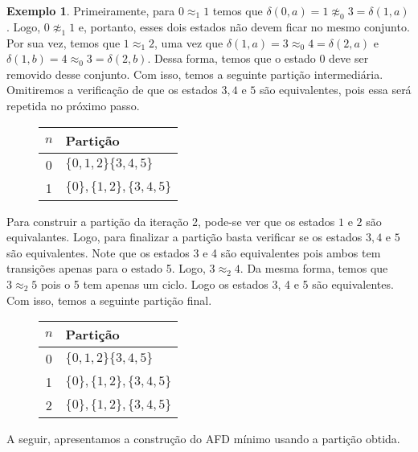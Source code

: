 \documentclass[a4paper]{article}
\theoremstyle{definition}
\newtheorem{Example}{Exemplo}
\begin{document}
\begin{Example}
    Primeiramente, para $0 \approx_1 1$ temos que $\delta(0,a) = 1 \not\approx_0
    3 = \delta(1,a)$. Logo, $0\not\approx_1 1$ e, portanto, esses dois estados
    não devem ficar no mesmo conjunto. Por sua vez, temos que $1 \approx_1 2$,
    uma vez que $\delta(1,a) = 3 \approx_0 4 = \delta(2,a)$ e
    $\delta(1,b) = 4 \approx_0 3 = \delta(2,b)$. Dessa forma, temos que o estado
    $0$ deve ser removido desse conjunto. Com isso, temos a seguinte partição
    intermediária. Omitiremos a verificação de que os estados $3,4$ e $5$ são
    equivalentes, pois essa será repetida no próximo passo.
    \begin{figure}[H]
      \begin{tabular}{|c|l|}
        \hline
        $n$ & Partição \\ \hline
        0   & $\{0,1,2\}\{3,4,5\}$ \\\hline
        1   & $\{0\},\{1,2\},\{3,4,5\}$ \\ \hline
      \end{tabular}
      \centering
    \end{figure}
    Para construir a partição da iteração 2, pode-se ver que os estados $1$ e
    $2$ são equivalantes. Logo, para finalizar a partição basta verificar se
    os estados $3,4$ e $5$ são equivalentes. Note que os estados 3 e 4 são
    equivalentes pois ambos tem transições apenas para o estado 5. Logo,
    $3 \approx_2 4$. Da mesma forma, temos que $3 \approx_2 5$ pois o 5 tem
    apenas um ciclo. Logo os estados 3, 4 e 5 são equivalentes. Com isso, temos
    a seguinte partição final.
    \begin{figure}[H]
      \begin{tabular}{|c|l|}
        \hline
        $n$ & Partição \\ \hline
        0   & $\{0,1,2\}\{3,4,5\}$ \\\hline
        1   & $\{0\},\{1,2\},\{3,4,5\}$ \\ \hline
        2   & $\{0\},\{1,2\},\{3,4,5\}$ \\ \hline
      \end{tabular}
      \centering
    \end{figure}
    A seguir, apresentamos a construção do AFD mínimo usando a partição obtida.
    \begin{figure}[H]
      \centering
    \end{figure}
  \end{Example}
  
\end{document}
